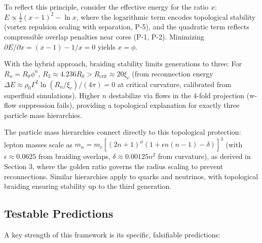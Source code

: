To reflect this principle, consider the effective energy for the ratio $x$: $E \propto \frac{1}{2} (x - 1)^2 - \ln x$, where the logarithmic term encodes topological stability (vortex repulsion scaling with separation, P-5), and the quadratic term reflects compressible overlap penalties near cores (P-1, P-2). Minimizing $\partial E / \partial x = (x - 1) - 1/x = 0$ yields $x = \phi$.

With the hybrid approach, braiding stability limits generations to three: For $R_n = R_0 \phi^n$, $R_3 \approx 4.236 R_0 > R_{\text{crit}} \approx 20 \xi_c$ (from reconnection energy $\Delta E \approx \rho_0 \Gamma^2 \ln(R_n / \xi_c) / (4\pi) = 0$ at critical curvature, calibrated from superfluid simulations). Higher $n$ destabilize via flows in the 4-fold projection (w-flow suppression fails), providing a topological explanation for exactly three particle mass hierarchies.

The particle mass hierarchies connect directly to this topological protection: lepton masses scale as $m_n = m_e [(2n+1)^\phi (1 + \epsilon n(n-1) - \delta)]^3$ (with $\epsilon \approx 0.0625$ from braiding overlaps, $\delta \approx 0.00125 n^2$ from curvature), as derived in Section 3, where the golden ratio governs the radius scaling to prevent reconnections. Similar hierarchies apply to quarks and neutrinos, with topological braiding ensuring stability up to the third generation.

\medskip

\subsection{Testable Predictions}

A key strength of this framework is its specific, falsifiable predictions:

